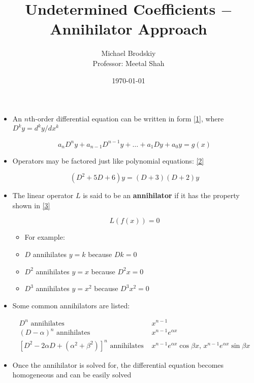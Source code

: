 \documentclass[12pt]{article}
\title{Undetermined Coefficients $-$ Annihilator Approach}
\date{\today}
\author{Michael Brodskiy\\ \small Professor: Meetal Shah}
\begin{document}
\maketitle

\begin{itemize}

  \item An $n$th-order differential equation can be written in form \eqref{1}, where $D^ky=d^ky/dx^k$ 

    \begin{equation}
      a_nD^ny+a_{n-1}D^{n-1}y+\dots+a_1Dy+a_0y=g(x)
      \label{1}
    \end{equation}

  \item Operators may be factored just like polynomial equations: \eqref{2}

    \begin{equation}
      (D^2+5D+6)y = (D+3)(D+2)y
      \label{2}
    \end{equation}

  \item The linear operator $L$ is said to be an \textbf{annihilator} if it has the property shown in \eqref{3}

    \begin{equation}
      L(f(x))=0
      \label{3}
    \end{equation}

    \begin{itemize}

      \item For example:

      \item $D$ annihilates $y=k$ because $Dk=0$

      \item $D^2$ annihilates $y=x$ because $D^2x=0$

      \item $D^3$ annihilates $y=x^2$ because $D^3x^2=0$

    \end{itemize}

  \item Some common annihilators are listed:

    \begin{equation}
      \begin{split}
        D^n \text{ annihilates } & x^{n-1}\\
        (D-\alpha)^n \text{ annihilates } & x^{n-1}e^{\alpha x}\\
        [D^2-2\alpha D+(\alpha^2+\beta^2)]^n \text{ annihilates } & x^{n-1}e^{\alpha x} \cos \beta x,\, x^{n-1}e^{\alpha x} \sin \beta x
      \end{split}
      \label{4}
    \end{equation}

  \item Once the annihilator is solved for, the differential equation becomes homogeneous and can be easily solved

\end{itemize}
\end{document}
